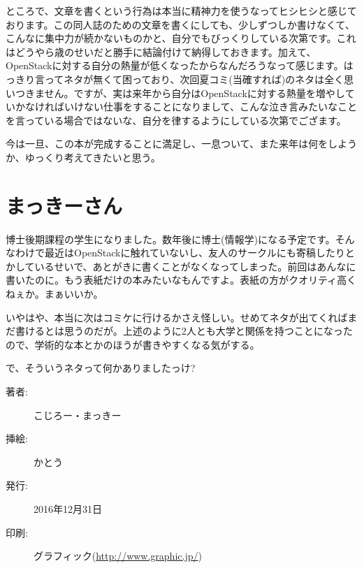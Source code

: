 \documentclass[9pt,b5paper,papersize,openany]{jsbook}
\begin{document}
ところで、文章を書くという行為は本当に精神力を使うなってヒシヒシと感じております。この同人誌のための文章を書くにしても、少しずつしか書けなくて、こんなに集中力が続かないものかと、自分でもびっくりしている次第です。これはどうやら歳のせいだと勝手に結論付けて納得しておきます。加えて、OpenStackに対する自分の熱量が低くなったからなんだろうなって感じます。はっきり言ってネタが無くて困っており、次回夏コミ(当確すれば)のネタは全く思いつきません。ですが、実は来年から自分はOpenStackに対する熱量を増やしていかなければいけない仕事をすることになりまして、こんな泣き言みたいなことを言っている場合ではないな、自分を律するようにしている次第でござます。

今は一旦、この本が完成することに満足し、一息ついて、また来年は何をしようか、ゆっくり考えてきたいと思う。

\section*{まっきーさん}

博士後期課程の学生になりました。数年後に博士(情報学)になる予定です。そんなわけで最近はOpenStackに触れていないし、友人のサークルにも寄稿したりとかしているせいで、あとがきに書くことがなくなってしまった。前回はあんなに書いたのに。もう表紙だけの本みたいなもんですよ。表紙の方がクオリティ高くねぇか。まぁいいか。

いやはや、本当に次はコミケに行けるかさえ怪しい。せめてネタが出てくればまだ書けるとは思うのだが。上述のように2人とも大学と関係を持つことになったので、学術的な本とかのほうが書きやすくなる気がする。

で、そういうネタって何かありましたっけ?

\newpage
\thispagestyle{empty}
\begin{minipage}{0.5\paperwidth}
	\begin{description}
		\item[著者:]こじろー・まっきー
		\item[挿絵:]かとう
		\item[発行:]2016年12月31日
		\item[印刷:]グラフィック(\url{http://www.graphic.jp/})
	\end{description}
\end{minipage}
\end{document}
